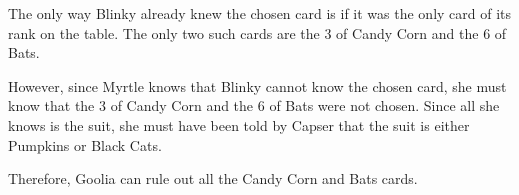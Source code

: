

%

%
%
%

The only way Blinky already knew the chosen card is if it was the only card
of its rank on the table. The only two such cards are the 3 of Candy Corn
and the 6 of Bats.

However, since Myrtle knows that Blinky cannot know the chosen card,
she must know that the 3 of Candy Corn and the 6 of Bats were not chosen.
Since all she knows is the suit, she must have been told by Capser that
the suit is either Pumpkins or Black Cats.

Therefore, Goolia can rule out all the Candy Corn and Bats cards.
